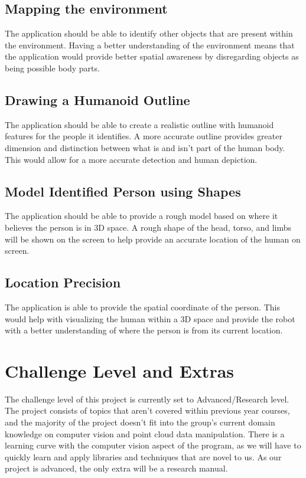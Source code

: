 \documentclass{article}
\begin{document}
\subsection{Mapping the environment}
The application should be able to identify other objects that are present within the environment. Having a better understanding of the environment means that the application would provide better spatial awareness by disregarding objects as being possible body parts.

\subsection{Drawing a Humanoid Outline}
The application should be able to create a realistic outline with humanoid features for the people it identifies. A more accurate outline provides greater dimension and distinction between what is and isn’t part of the human body. This would allow for a more accurate detection and human depiction.
  
\subsection{Model Identified Person using Shapes}
The application should be able to provide a rough model based on where it believes the person is in 3D space. A rough shape of the head, torso, and limbs will be shown on the screen to help provide an accurate location of the human on screen.

\subsection{Location Precision}
The application is able to provide the spatial coordinate of the person. This would help with visualizing the human within a 3D space and provide the robot with a better understanding of where the person is from its current location.

\section{Challenge Level and Extras}

The challenge level of this project is currently set to Advanced/Research level. The project consists of topics 
that aren't covered within previous year courses, and the majority of the project doesn't fit into the group's current domain knowledge on computer vision and point cloud data manipulation. 
There is a learning curve with the computer vision aspect of the program, as we will have to quickly learn and apply libraries and techniques that are novel to us. As our project is advanced, the only extra will be a research manual.
\end{document}
